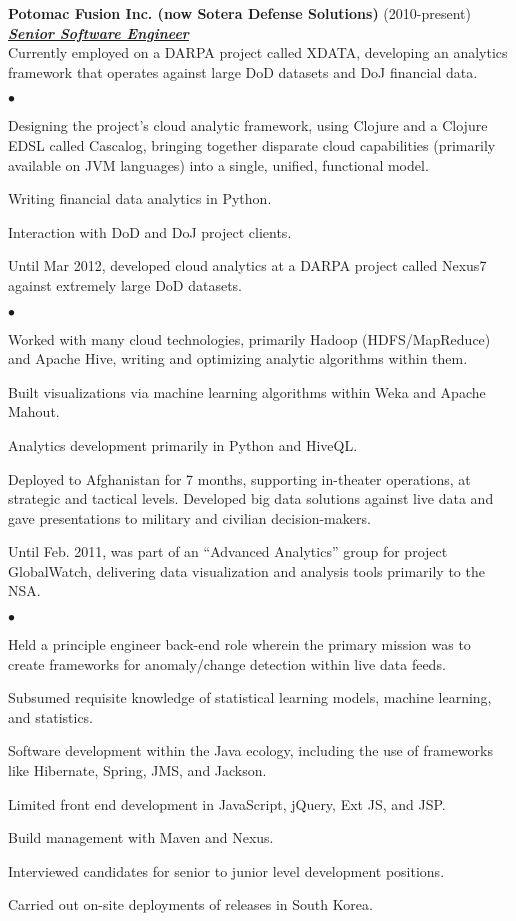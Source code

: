 \documentclass{article}
\newcommand{\employer}[3]{{ \textbf{#1} (#2)\\ \underline{\textbf{\emph{#3}}}\\  }}
\newenvironment{achievements}{\begin{list}{$\bullet$}{\topsep 0pt \itemsep
      -2pt}}{\vspace*{4pt}\end{list}}
\begin{document}
\employer{Potomac Fusion Inc. (now Sotera Defense
  Solutions)}{2010-present}{Senior Software Engineer} Currently employed on a
DARPA project called XDATA, developing an analytics framework that operates
against large DoD datasets and DoJ financial data.
\begin{achievements}
\item Designing the project's cloud analytic framework, using Clojure and a
  Clojure EDSL called Cascalog, bringing together disparate cloud capabilities
  (primarily available on JVM languages) into a single, unified, functional
  model.
\item Writing financial data analytics in Python.
\item Interaction with DoD and DoJ project clients.
\end{achievements}
Until Mar 2012, developed cloud analytics at a DARPA project called Nexus7
against extremely large DoD datasets.
\begin{achievements}
\item Worked with many cloud technologies, primarily Hadoop (HDFS/MapReduce)
  and Apache Hive, writing and optimizing analytic algorithms within them.
\item Built visualizations via machine learning algorithms within Weka and
  Apache Mahout.
\item Analytics development primarily in Python and HiveQL.
\item Deployed to Afghanistan for 7 months, supporting in-theater operations,
  at strategic and tactical levels.  Developed big data solutions against live
  data and gave presentations to military and civilian decision-makers.
\end{achievements}
Until Feb. 2011, was part of an ``Advanced Analytics'' group for project
GlobalWatch, delivering data visualization and analysis tools primarily to the
NSA.
\begin{achievements}
\item Held a principle engineer back-end role wherein the primary mission was
  to create frameworks for anomaly/change detection within live data feeds.
\item Subsumed requisite knowledge of statistical learning models, machine
  learning, and statistics.
\item Software development within the Java ecology, including the use of
  frameworks like Hibernate, Spring, JMS, and Jackson.
\item Limited front end development in JavaScript, jQuery, Ext JS, and JSP.
\item Build management with Maven and Nexus.
\item Interviewed candidates for senior to junior level development positions.
\item Carried out on-site deployments of releases in South Korea.
\end{achievements}
\end{document}
